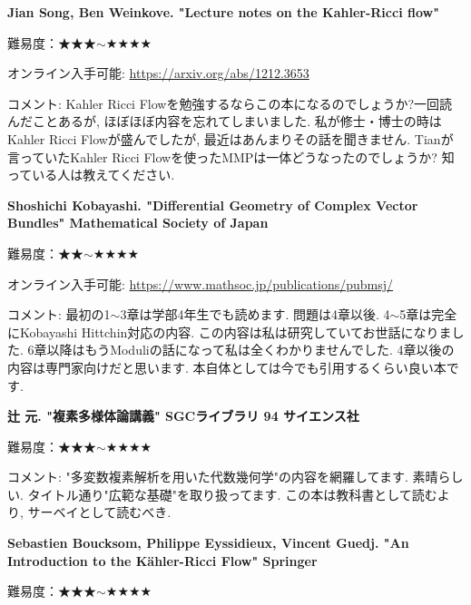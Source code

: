 \textbf{Jian Song, Ben Weinkove. "Lecture notes on the Kahler-Ricci flow"}  \vspace{-6pt} 

難易度：★★★$\sim$★★★★ \vspace{-6pt} 

オンライン入手可能: \url{https://arxiv.org/abs/1212.3653}\vspace{-6pt}

コメント: Kahler Ricci Flowを勉強するならこの本になるのでしょうか?一回読んだことあるが, ほぼほぼ内容を忘れてしまいました. 私が修士・博士の時はKahler Ricci Flowが盛んでしたが, 最近はあんまりその話を聞きません. Tianが言っていたKahler Ricci Flowを使ったMMPは一体どうなったのでしょうか? 知っている人は教えてください. 
\vspace{8pt}

\textbf{Shoshichi Kobayashi. "Differential Geometry of Complex Vector Bundles"  Mathematical Society of Japan}  \vspace{-6pt} 

難易度：★★$\sim$★★★★ \vspace{-6pt} 

オンライン入手可能: \url{https://www.mathsoc.jp/publications/pubmsj/}\vspace{-6pt}

コメント: 最初の1$\sim$3章は学部4年生でも読めます. 問題は4章以後.  4$\sim$5章は完全にKobayashi Hittchin対応の内容. この内容は私は研究していてお世話になりました. 6章以降はもうModuliの話になって私は全くわかりませんでした. 4章以後の内容は専門家向けだと思います. 本自体としては今でも引用するくらい良い本です. %
\vspace{8pt}

\textbf{辻 元. "複素多様体論講義" SGCライブラリ 94 サイエンス社}  \vspace{-6pt} 

難易度：★★★$\sim$★★★★ \vspace{-6pt} 

コメント: "多変数複素解析を用いた代数幾何学"の内容を網羅してます. 素晴らしい. タイトル通り"広範な基礎"を取り扱ってます. この本は教科書として読むより, サーベイとして読むべき. 
\vspace{8pt}

\textbf{Sebastien Boucksom, Philippe Eyssidieux, Vincent Guedj. "An Introduction to the Kähler-Ricci Flow" Springer}  \vspace{-6pt} 

難易度：★★★$\sim$★★★★ \vspace{-6pt} 

